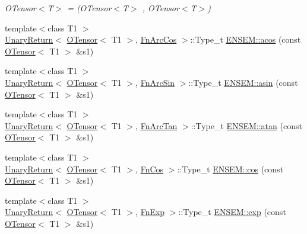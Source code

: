 \begin{DoxyCompactItemize}
\begin{DoxyCompactList}\small\item\em O\+Tensor$<$\+T$>$ = (O\+Tensor$<$\+T$>$ , O\+Tensor$<$\+T$>$) \end{DoxyCompactList}\item 
{\footnotesize template$<$class T1 $>$ }\\\mbox{\hyperlink{structENSEM_1_1UnaryReturn}{Unary\+Return}}$<$ \mbox{\hyperlink{classENSEM_1_1OTensor}{O\+Tensor}}$<$ T1 $>$, \mbox{\hyperlink{structENSEM_1_1FnArcCos}{Fn\+Arc\+Cos}} $>$\+::Type\+\_\+t \mbox{\hyperlink{group__obstensor_gae3685afbb0e9aa5d37b76c81e344a490}{E\+N\+S\+E\+M\+::acos}} (const \mbox{\hyperlink{classENSEM_1_1OTensor}{O\+Tensor}}$<$ T1 $>$ \&s1)
\item 
{\footnotesize template$<$class T1 $>$ }\\\mbox{\hyperlink{structENSEM_1_1UnaryReturn}{Unary\+Return}}$<$ \mbox{\hyperlink{classENSEM_1_1OTensor}{O\+Tensor}}$<$ T1 $>$, \mbox{\hyperlink{structENSEM_1_1FnArcSin}{Fn\+Arc\+Sin}} $>$\+::Type\+\_\+t \mbox{\hyperlink{group__obstensor_gac2f3c33b51a9ad0b1d382eb02ba089df}{E\+N\+S\+E\+M\+::asin}} (const \mbox{\hyperlink{classENSEM_1_1OTensor}{O\+Tensor}}$<$ T1 $>$ \&s1)
\item 
{\footnotesize template$<$class T1 $>$ }\\\mbox{\hyperlink{structENSEM_1_1UnaryReturn}{Unary\+Return}}$<$ \mbox{\hyperlink{classENSEM_1_1OTensor}{O\+Tensor}}$<$ T1 $>$, \mbox{\hyperlink{structENSEM_1_1FnArcTan}{Fn\+Arc\+Tan}} $>$\+::Type\+\_\+t \mbox{\hyperlink{group__obstensor_gad2ff83f1912b705b331d775f9c4dfb5a}{E\+N\+S\+E\+M\+::atan}} (const \mbox{\hyperlink{classENSEM_1_1OTensor}{O\+Tensor}}$<$ T1 $>$ \&s1)
\item 
{\footnotesize template$<$class T1 $>$ }\\\mbox{\hyperlink{structENSEM_1_1UnaryReturn}{Unary\+Return}}$<$ \mbox{\hyperlink{classENSEM_1_1OTensor}{O\+Tensor}}$<$ T1 $>$, \mbox{\hyperlink{structENSEM_1_1FnCos}{Fn\+Cos}} $>$\+::Type\+\_\+t \mbox{\hyperlink{group__obstensor_gab6c0f7f88211609a81b1ab43c346d285}{E\+N\+S\+E\+M\+::cos}} (const \mbox{\hyperlink{classENSEM_1_1OTensor}{O\+Tensor}}$<$ T1 $>$ \&s1)
\item 
{\footnotesize template$<$class T1 $>$ }\\\mbox{\hyperlink{structENSEM_1_1UnaryReturn}{Unary\+Return}}$<$ \mbox{\hyperlink{classENSEM_1_1OTensor}{O\+Tensor}}$<$ T1 $>$, \mbox{\hyperlink{structENSEM_1_1FnExp}{Fn\+Exp}} $>$\+::Type\+\_\+t \mbox{\hyperlink{group__obstensor_ga6403c57fdf642c4972f11c2251aff2ef}{E\+N\+S\+E\+M\+::exp}} (const \mbox{\hyperlink{classENSEM_1_1OTensor}{O\+Tensor}}$<$ T1 $>$ \&s1)

\end{DoxyCompactItemize}

